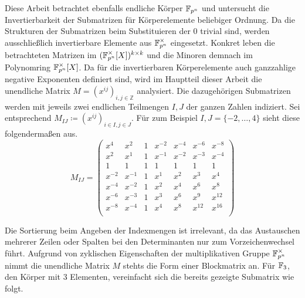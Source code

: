Diese Arbeit betrachtet ebenfalls endliche Körper $\field{p}[n]$ und untersucht die Invertierbarkeit der Submatrizen für Körperelemente beliebiger Ordnung. Da die Strukturen der Submatrizen beim Substituieren der $0$ trivial sind, werden ausschließlich invertierbare Elemente aus $\field{p}[n]^\times$ eingesetzt. Konkret leben die betrachteten Matrizen im $(\field{p}[n]^\times [X])^{k \times k}$ und die Minoren demnach im Polynomring $\field{p}[n]^\times [X]$. Da für die invertierbaren Körperelemente auch ganzzahlige negative Exponenten definiert sind, wird im Hauptteil dieser Arbeit die unendliche Matrix $M = \left( x^{ij} \right)_{i,j \in \mathbb{Z}}$ analysiert. Die dazugehörigen Submatrizen werden mit jeweils zwei endlichen Teilmengen $I,J$ der ganzen Zahlen indiziert. Sei entsprechend $M_{IJ} \coloneqq \left( x^{ij} \right)_{i \in I,j \in J}$. Für zum Beispiel $I,J = \{-2, \dots, 4\}$ sieht diese folgendermaßen aus.
\begin{equation*}
    M_{IJ} = \begin{pmatrix}
        x^4     & x^{2} & 1    & x^{-2} & x^{-4}& x^{-6}& x^{-8}\\
        x^{2}   & x^{1} & 1    & x^{-1} & x^{-2}& x^{-3}& x^{-4}\\
        1       & 1     & 1    & 1      & 1     & 1     & 1     \\
        x^{-2}  & x^{-1}& 1    & x^{1}  & x^{2} & x^{3} & x^{4} \\
        x^{-4}  & x^{-2}& 1    & x^{2}  & x^{4} & x^{6} & x^{8} \\
        x^{-6}  & x^{-3}& 1    & x^{3}  & x^{6} & x^{9} & x^{12} \\
        x^{-8}  & x^{-4}& 1    & x^{4}  & x^{8} & x^{12} & x^{16} \\
    \end{pmatrix}
\end{equation*}

Die Sortierung beim Angeben der Indexmengen ist irrelevant, da das Austauschen mehrerer Zeilen oder Spalten bei den Determinanten nur zum Vorzeichenwechsel führt. Aufgrund von zyklischen Eigenschaften der multiplikativen Gruppe $\field{p}[n]^\times$ nimmt die unendliche Matrix $M$ stehts die Form einer Blockmatrix an. Für $\field{3}$, den Körper mit 3 Elementen, vereinfacht sich die bereits gezeigte Submatrix wie folgt.

